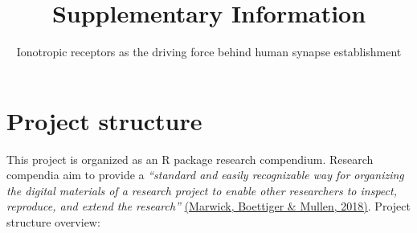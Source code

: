 \documentclass[
]{article}
\title{Supplementary Information}
\subtitle{Ionotropic receptors as the driving force behind human synapse
establishment}
\date{}
\begin{document}
\maketitle

{
\setcounter{tocdepth}{3}
\tableofcontents
}
\hypertarget{project-structure}{%
\section{Project structure}\label{project-structure}}

This project is organized as an R package research compendium. Research
compendia aim to provide a \emph{``standard and easily recognizable way
for organizing the digital materials of a research project to enable
other researchers to inspect, reproduce, and extend the research''}
\href{https://doi.org/10.1080/00031305.2017.1375986}{(Marwick, Boettiger
\& Mullen, 2018)}. Project structure overview:
\end{document}
